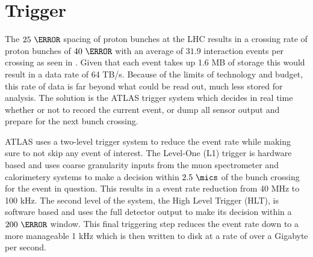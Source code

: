 \section{Trigger} \label{sec:atlas:trigger}

The $25~\ns$ spacing of proton bunches at the LHC results in a crossing rate of
proton bunches of $40~\MHz$ with an average of $31.9$ \pp interaction events per
crossing as seen in .  Given that each event takes up 1.6 MB
of storage this would result in a data rate of 64 TB/s.  Because of the limits
of technology and budget, this rate of data is far beyond what could be read
out, much less stored for analysis. The solution is the ATLAS trigger system
which decides in real time whether or not to record the current event, or dump
all sensor output and prepare for the next bunch crossing.

ATLAS uses a two-level trigger system to reduce the event rate while making
sure to not skip any event of interest.  The Level-One (L1) trigger is hardware
based and uses coarse granularity inputs from the muon spectrometer and
calorimetery systems to make a decision within $2.5~\mics$ of the bunch
crossing for the event in question. This results in a event rate reduction from
40 MHz to 100 kHz.  The second level of the system, the High Level Trigger
(HLT), is software based and uses the full detector output to make its decision
within a $200~\ms$ window. This final triggering step reduces the event rate down
to a more manageable 1 kHz which is then written to disk at a rate of over a
Gigabyte per second.
